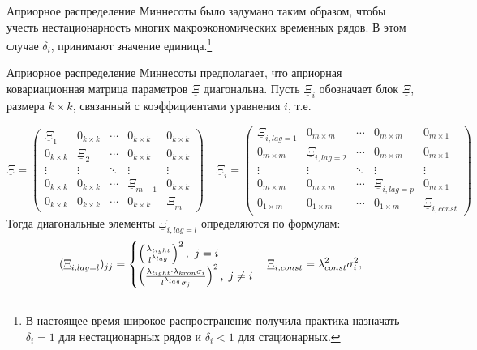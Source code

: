 \documentclass[11pt]{article} %
\newcommand{\prior}{\underline}
\begin{document}

Априорное распределение Миннесоты было задумано таким образом, чтобы учесть нестационарность многих макроэкономических временных рядов. В этом случае $\delta_{i}$, принимают значение единица.\footnote{В настоящее время широкое распространение получила практика назначать $\delta_{i}=1$ для нестационарных рядов и $\delta_{i}<1$ для стационарных.}

Априорное распределение Миннесоты предполагает, что априорная ковариационная матрица параметров $\prior \Xi$ диагональна. Пусть $\prior \Xi_i$ обозначает блок $\prior \Xi$, размера $k\times k$, связанный с коэффициентами уравнения $i$, т.е.  

\begin{equation*}
\prior \Xi=\begin{pmatrix}
\prior \Xi_1&0_{k\times k}&\cdots&0_{k\times k}&0_{k\times k}\\
0_{k\times k}& \prior \Xi_2& \cdots &0_{k\times k}&0_{k\times k}\\
\vdots &\vdots& \ddots&\vdots& \vdots\\
0_{k\times k}&0_{k\times k}&\cdots&\prior\Xi_{m-1} & 0_{k\times k}\\
0_{k\times k}&0_{k\times k}&\cdots&0_{k\times k}&\prior \Xi_m
\end{pmatrix}
\quad
\prior \Xi_i=\begin{pmatrix}
\prior \Xi_{i,lag=1}&0_{m\times m}&\cdots&0_{m\times m}&0_{m\times 1}\\
0_{m\times m}& \prior \Xi_{i,lag=2}& \cdots &0_{m\times m}&0_{m\times 1}\\
\vdots &\vdots& \ddots& \vdots&\vdots\\
0_{m\times m}&0_{m\times m}&\cdots&\prior \Xi_{i,lag=p}&0_{m\times 1}\\
0_{1\times m}&0_{1\times m}&\cdots&0_{1\times m}&\prior \Xi_{i,const}
\end{pmatrix}
\end{equation*}
Тогда  диагональные элементы  $\prior \Xi_{i,lag=l}$ определяются по формулам:
\begin{equation}
(\prior \Xi_{i,lag=l})_{jj}
=\begin{cases}
\left(\frac{\lambda_{tight}}{l^{\lambda_{lag}}}\right)^2,\ j=i\\
\left(\frac{\lambda_{tight}\cdot\lambda_{kron}\sigma_i}{l^{\lambda_{lag}}\sigma_j}\right)^2, \; j\ne i
\end{cases}\\
\prior \Xi_{i,const}
=\lambda_{const}^2\sigma_i^2, 
\label{minnesota_variance}
\end{equation}
\end{document}

